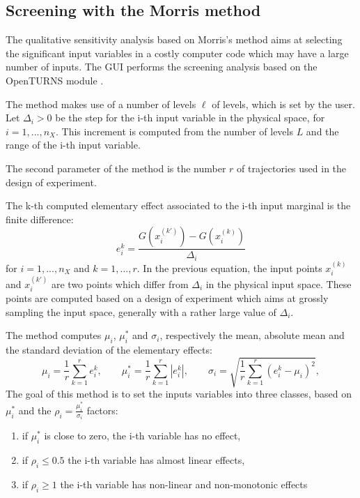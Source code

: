 \documentclass{uncecomp2019}
\begin{document}
\subsection{Screening with the Morris method}

The qualitative sensitivity analysis based on Morris's method \cite{Morris1991} aims at 
selecting the significant input variables in a costly computer code which may have 
a large number of inputs. 
The GUI performs the screening analysis based on the OpenTURNS  module \cite{otmorris}. 

The method makes use of a number of levels $\ell$ of levels, which is set by the user. 
Let $\Delta_i>0$ be the step for the i-th input variable in the physical space, 
for $i=1,...,n_X$. 
This increment is computed from the number of levels $L$ and the range of the i-th input 
variable.

The second parameter of the method is the number $r$ of trajectories used in the 
design of experiment. 

The k-th computed elementary effect associated to the i-th input marginal is the 
finite difference:
$$
e_i^k = \frac{G\left(x_i^{(k')}\right) - G\left(x_i^{(k)}\right)}{\Delta_i}
$$
for $i=1,...,n_X$ and $k=1,...,r$. 
In the previous equation, the input points $x_i^{(k)}$ and $x_i^{(k')}$ are two points 
which differ from $\Delta_i$ in the physical input space. 
These points are computed based on a design of experiment which aims at grossly 
sampling the input space, generally with a rather large value of $\Delta_i$. 

The method computes $\mu_i$, $\mu_i^*$ and $\sigma_i$, respectively the mean, absolute mean and 
the standard deviation of the elementary effects:
$$
\mu_i = \frac{1}{r} \sum_{k=1}^r e_i^k, \qquad 
\mu_i^* = \frac{1}{r} \sum_{k=1}^r |e_i^k|, \qquad 
\sigma_i = \sqrt{ \frac{1}{r} \sum_{k=1}^r (e_i^k - \mu_i)^2 }, 
$$
The goal of this method is to set the inputs variables into three classes, based on $\mu_i^*$ 
and the $\rho_i = \frac{\mu_i^*}{\sigma_i}$ factors:
\begin{enumerate}
\item if $\mu_i^*$ is close to zero, the i-th variable has no effect,
\item if $\rho_i \leq 0.5$ the i-th variable has almost linear effects,
\item if $\rho_i \geq 1$ the i-th variable has non-linear and non-monotonic effects
\end{enumerate}
\end{document}
